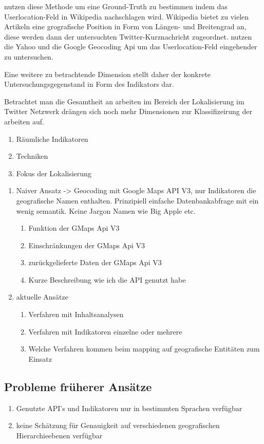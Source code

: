 		\cite{Hecht2011} nutzen diese Methode um eine Ground-Truth zu bestimmen indem das Userlocation-Feld in Wikipedia nachschlagen wird. Wikipedia bietet zu vielen Artikeln eine grografische Position in Form von Längen- und Breitengrad an, diese werden dann der untersuchten Twitter-Kurznachricht zugeordnet. 
		\cite{Hale2012} nutzen die Yahoo und die Google Geocoding Api um das Userlocation-Feld eingehender zu untersuchen.  
		

		
		Eine weitere zu betrachtende Dimension stellt daher der konkrete Untersuchungsgegenstand in Form des Indikators dar.


		Betrachtet man die Gesamtheit an arbeiten im Bereich der Lokalisierung im Twitter Netzwerk drängen sich noch mehr Dimensionen zur Klassifizeirung der arbeiten auf.

		\begin{enumerate}
		 	\item Räumliche Indikatoren
		 	\item Techniken
		 	\item Fokus der Lokalisierung
		 \end{enumerate} 	



		

		\begin{enumerate}
			\item Naiver Ansatz -> Geocoding mit Google Maps API V3, nur Indikatoren die geografische Namen enthalten. 
					Prinzipiell einfache Datenbankabfrage mit ein wenig semantik. 
					Keine Jargon Namen wie Big Apple etc.
				\begin{enumerate}
					\item Funktion der GMaps Api V3
					\item Einschränkungen der GMaps Api V3
					\item zurückgelieferte Daten der GMaps Api V3
					\item Kurze Beschreibung wie ich die API genutzt habe
				\end{enumerate}
			\item aktuelle Ansätze
				\begin{enumerate}
					\item Verfahren mit Inhaltsanalysen
					\item Verfahren mit Indikatoren einzelne oder mehrere
					\item Welche Verfahren kommen beim mapping auf  geografische Entitäten zum Einsatz
				\end{enumerate}
		\end{enumerate}

		\subsection{Probleme früherer Ansätze}
			\begin{enumerate}
				\item{Genutzte API's und Indikatoren nur in bestimmten Sprachen verfügbar}
				\item{keine Schätzung für Genauigkeit auf verschiedenen geografischen Hierarchieebenen verfügbar}  
			\end{enumerate}

	
	
	

	
